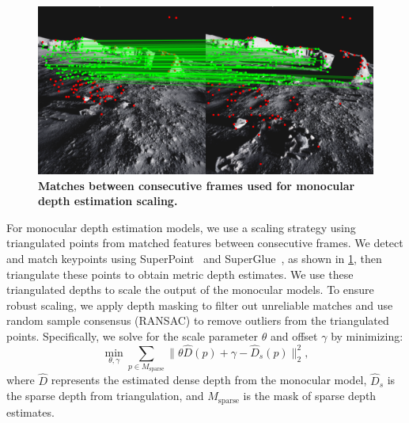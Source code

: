 \begin{figure}[t]
	\centering
	\includegraphics[width=\linewidth]{figures/matches.png}
	\caption{\bfseries Matches between consecutive frames used for monocular depth estimation scaling.}
	\label{fig:matches}
	\vspace{-1em}
\end{figure}
For monocular depth estimation models, we use a scaling strategy using triangulated points from matched features between consecutive frames. We detect and match keypoints using SuperPoint~\cite{detone_superpoint_2018} and SuperGlue~\cite{sarlin_superglue_2020}, as shown in \cref{fig:matches}, then triangulate these points to obtain metric depth estimates. We use these triangulated depths to scale the output of the monocular models. To ensure robust scaling, we apply depth masking to filter out unreliable matches and use random sample consensus (RANSAC) to remove outliers from the triangulated points. Specifically, we solve for the scale parameter $\theta$ and offset $\gamma$ by minimizing:
\begin{equation}
	\min_{\theta,\gamma} \sum_{p \in M_{\text{sparse}}} \|\theta \hat{D}(p) + \gamma - \hat{D}_s(p)\|_2^2,
\end{equation}
where $\hat{D}$ represents the estimated dense depth from the monocular model, $\hat{D}_s$ is the sparse depth from triangulation, and $M_{\text{sparse}}$ is the mask of sparse depth estimates.


